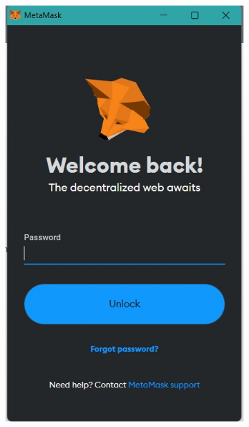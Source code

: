 \begin{itemize}
    \begin{figure} [H] \centering
      \centering
      \begin{subfigure}{0.45\textwidth}
          \includegraphics[scale=0.35]{gambar/integrasi_metamask.jpg}
          \caption{}
          \label{fig:intg_a}
      \end{subfigure}
      \hspace{5pt}
      \begin{subfigure}{0.45\textwidth}

\end{subfigure}
\end{figure}
\end{itemize}
